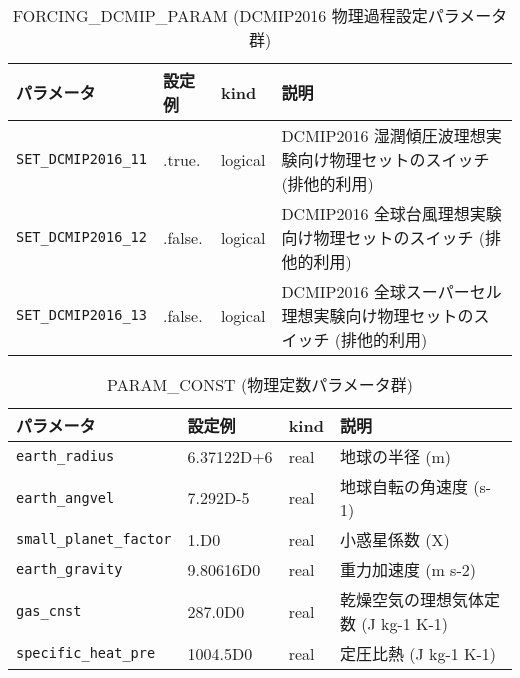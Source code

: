 \begin{table}[htb]
\begin{center}
\caption{FORCING\_DCMIP\_PARAM (DCMIP2016 物理過程設定パラメータ群)}
\begin{tabularx}{150mm}{|l|l|l|X|} \hline
 \rowcolor[gray]{0.9} パラメータ & 設定例 & kind & 説明          \\ \hline
 \verb|SET_DCMIP2016_11| & .true.  & logical & DCMIP2016 湿潤傾圧波理想実験向け物理セットのスイッチ (排他的利用) \\ \hline
 \verb|SET_DCMIP2016_12| & .false. & logical & DCMIP2016 全球台風理想実験向け物理セットのスイッチ (排他的利用) \\ \hline
 \verb|SET_DCMIP2016_13| & .false. & logical & DCMIP2016 全球スーパーセル理想実験向け物理セットのスイッチ (排他的利用) \\ \hline
\end{tabularx}
\end{center}
\end{table}

\begin{table}[htb]
\begin{center}
\caption{PARAM\_CONST (物理定数パラメータ群)}
\begin{tabularx}{150mm}{|l|l|l|X|} \hline
 \rowcolor[gray]{0.9} パラメータ & 設定例 & kind & 説明          \\ \hline
 \verb|earth_radius| & 6.37122D+6  & real & 地球の半径 (m) \\ \hline
 \verb|earth_angvel| & 7.292D-5    & real & 地球自転の角速度 (s-1) \\ \hline
 \verb|small_planet_factor| & 1.D0 & real & 小惑星係数 (X) \\ \hline
 \verb|earth_gravity|       & 9.80616D0 & real & 重力加速度 (m s-2) \\ \hline
 \verb|gas_cnst|            & 287.0D0   & real & 乾燥空気の理想気体定数 (J kg-1 K-1) \\ \hline
 \verb|specific_heat_pre|   & 1004.5D0  & real & 定圧比熱 (J kg-1 K-1) \\ \hline
\end{tabularx}
\end{center}
\end{table}


